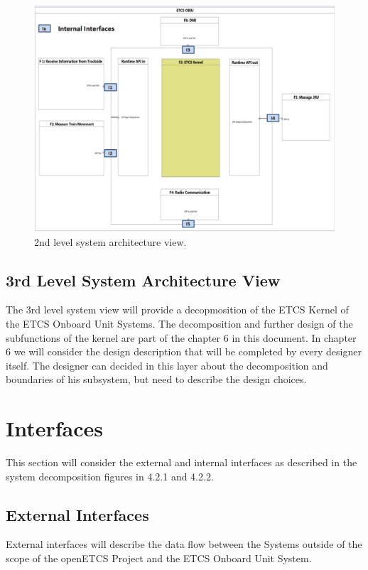 \begin{figure}
\centering
\includegraphics[scale=0.6]{images/2ndlevelarchitecture}
\caption{2nd level system architecture view.}
\label{2nd level System Architecture view}
\end{figure}

\subsection{3rd Level System Architecture View}
The 3rd level system view will provide a decopmosition of the ETCS Kernel of the ETCS Onboard Unit Systems. The decomposition and further design of the subfunctions of the kernel are part of the chapter 6 in this document. In chapter 6 we will consider the design description that will be completed by every designer itself. The designer can decided in this layer about the decomposition and boundaries of his subsystem, but need to describe the design choices.


\section{Interfaces}
This section will consider the external and internal interfaces as described in the system decomposition figures in 4.2.1 and 4.2.2.

\subsection{External Interfaces}
External interfaces will describe the data flow between the Systems outside of the scope of the openETCS Project and the ETCS Onboard Unit System.

